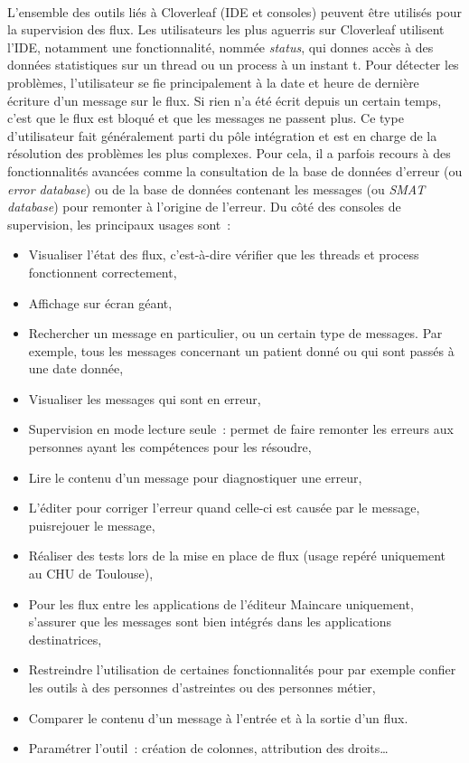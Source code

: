 			\paragraph{}%
			L’ensemble des outils liés à Cloverleaf (IDE et consoles)
			peuvent être utilisés pour la supervision des flux. Les utilisateurs les plus
			aguerris sur Cloverleaf utilisent l’IDE, notamment une fonctionnalité,
			nommée \textit{status}, qui donnes accès à des données statistiques sur un
			thread ou un process à un instant t. Pour détecter les problèmes,
			l’utilisateur se fie principalement à la date et heure de dernière écriture
			d’un message sur le flux. Si rien n’a été écrit depuis un certain temps, c’est que
			le flux est bloqué et que les messages ne passent plus. Ce type d’utilisateur
			fait généralement parti du pôle intégration et est en charge de la résolution
			des problèmes les plus complexes.
			Pour cela, il a parfois recours à des fonctionnalités avancées comme la
			consultation de la base de données d'erreur (ou \textit{error database}) ou
			de la base de données contenant les messages (ou \textit{SMAT database})
			pour remonter à l’origine de l’erreur.\newline
			Du côté des consoles de supervision, les principaux usages sont~:
			\begin{itemize}
			  \item Visualiser l’état des flux, c'est-à-dire vérifier que les threads et
			  process fonctionnent correctement,
			  \item Affichage sur écran géant,
			  \item Rechercher un message en particulier, ou un certain type de
			  messages. Par exemple, tous les messages concernant un patient donné ou
			  qui sont passés à une date donnée,
			  \item Visualiser les messages qui sont en erreur,
			  \item Supervision en mode lecture seule~: permet de faire remonter les
			  erreurs aux personnes ayant les compétences pour les résoudre,
			  \item Lire le contenu d'un message pour diagnostiquer une erreur,
			  \item L'éditer pour corriger l'erreur quand celle-ci est causée par le
			  message, puisrejouer le message,
			  \item Réaliser des tests lors de la mise en place de flux (usage repéré
			  uniquement au CHU de Toulouse),
			  \item Pour les flux entre les applications de l'éditeur Maincare
			  uniquement, s’assurer que les messages sont bien intégrés dans les
			  applications destinatrices,
			  \item Restreindre l’utilisation de certaines fonctionnalités pour par
			  exemple confier les outils à des personnes d’astreintes ou des personnes
			  métier,
			  \item Comparer le contenu d’un message à l'entrée et à la sortie d'un flux.
			  \item Paramétrer l’outil~: création de colonnes, attribution des droits…
			\end{itemize}

